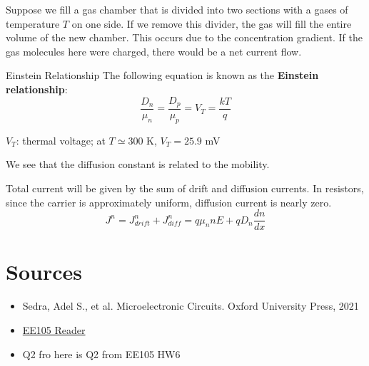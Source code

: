 Suppose we fill a gas chamber that is divided into two sections with a gases of temperature $T$ on one side. If we remove this divider, the gas will fill the entire volume of the new chamber. This occurs due to the concentration gradient. If the gas molecules here were charged, there would be a net current flow.

\begin{Analysis}{Einstein Relationship}{}
    The following equation is known as the \textbf{Einstein relationship}:
        \[\frac{D_n}{\mu_n} = \frac{D_p}{\mu_p} = V_T = \frac{kT}{q}\]
    \begin{gline}
        \item $V_T$: thermal voltage; at $T \simeq 300$ K, $V_T = 25.9$ mV
    \end{gline}
    We see that the diffusion constant is related to the mobility.
\end{Analysis}
Total current will be given by the sum of drift and diffusion currents. In resistors, since the carrier is approximately uniform, diffusion current is nearly zero.
    \[J^n = J_{drift}^n + J_{diff}^n = q\mu_n n E + qD_n \frac{dn}{dx}\]



\section{Sources}
\begin{itemize}
    \item Sedra, Adel S., et al. Microelectronic Circuits. Oxford University Press, 2021
    \item \href{https://file.notion.so/f/f/048d6522-202b-48d4-b5d9-bc005bd602e2/214bf1f0-292f-48d6-9016-737d9f5da155/ee105_reader_v3.pdf?id=237a4300-3dbe-47d1-888b-ffae90d8352b&table=block&spaceId=048d6522-202b-48d4-b5d9-bc005bd602e2&expirationTimestamp=1714435200000&signature=yx-H1qvZJIodPfazOpwXX0Ce2mWMG8skOHl45xoPxus&downloadName=ee105_reader_v3.pdf}{EE105 Reader}
    \item Q2 fro here is Q2 from EE105 HW6
\end{itemize}
